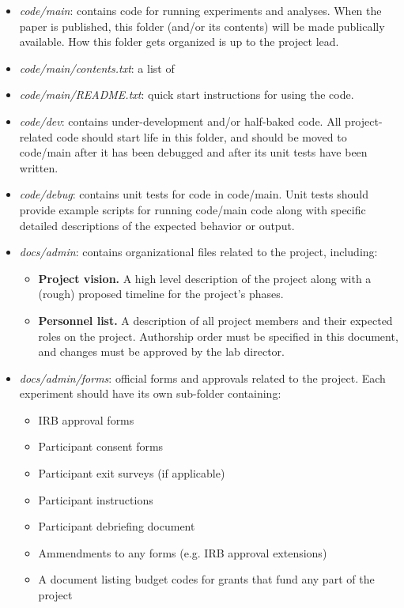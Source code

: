 \documentclass{tufte-book} %
\begin{document}
\begin{itemize}
\item \textit{code/main}: contains code for running experiments and
  analyses.  When the paper is published, this folder (and/or its contents) will be made
  publically available.  How this folder gets organized is up to the
  project lead.
\item \textit{code/main/contents.txt}: a list of 
\item \textit{code/main/README.txt}: quick start instructions for
  using the code.
\item \textit{code/dev}: contains under-development and/or half-baked
  code.  All project-related code should start life in this folder,
  and should be moved to code/main after it has been debugged and
  after its unit tests have been written.
\item \textit{code/debug}: contains unit tests for code in code/main.
  Unit tests should provide example scripts for running code/main code
  along with specific detailed descriptions of the expected behavior
  or output.
\item \textit{docs/admin}: contains organizational files related to the
  project, including:
\begin{itemize}
\item \textbf{Project vision.}  A high level description of the
  project along with a (rough) proposed timeline for the project's
  phases.
\item \textbf{Personnel list.}  A description of all project members
  and their expected roles on the project.  Authorship order must be
  specified in this document, and changes must be approved by the lab
  director.
\end{itemize}
\item \textit{docs/admin/forms}: official forms and approvals related to
  the project.  Each experiment should have its own sub-folder
  containing:
\begin{itemize}
  \item IRB approval forms
  \item Participant consent forms
  \item Participant exit surveys (if applicable)
  \item Participant instructions
  \item Participant debriefing document
  \item Ammendments to any forms (e.g. IRB approval extensions)
  \item A document listing budget codes for grants that fund any part
    of the project  
\end{itemize}
\end{itemize}
\end{document}

